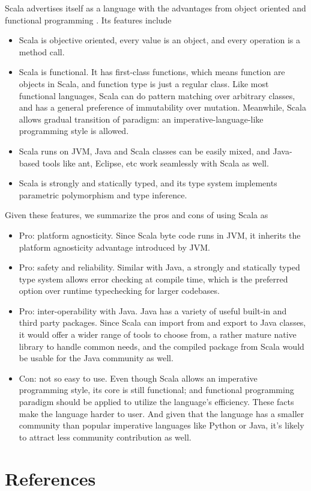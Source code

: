 \documentclass[letterpaper,twocolumn,10pt]{article}
\begin{document}
Scala advertises itself as a language with the advantages from object oriented and functional programming \cite{Scala}. Its features include
\begin{itemize}
\item Scala is objective oriented, every value is an object, and every operation is a method call.
\item Scala is functional. It has first-class functions, which means function are objects in Scala, and function type is just a regular class. Like most functional languages, Scala can do pattern matching over arbitrary classes, and has a general preference of immutability over mutation. Meanwhile, Scala allows gradual transition of paradigm: an imperative-language-like programming style is allowed.
\item Scala runs on JVM, Java and Scala classes can be easily mixed, and Java-based tools like ant, Eclipse, etc work seamlessly with Scala as well.
\item Scala is strongly and statically typed, and its type system implements parametric polymorphism and type inference. \cite{ScalaTypes}
\end{itemize}
Given these features, we summarize the pros and cons of using Scala as
\begin{itemize}
\item Pro: platform agnosticity. Since Scala byte code runs in JVM, it inherits the platform agnosticity advantage introduced by JVM.
\item Pro: safety and reliability. Similar with Java, a strongly and statically typed type system allows error checking at compile time, which is the preferred option over runtime typechecking for larger codebases.
\item Pro: inter-operability with Java. Java has a variety of useful built-in and third party packages. Since Scala can import from and export to Java classes, it would offer a wider range of tools to choose from, a rather mature native library to handle common needs, and the compiled package from Scala would be usable for the Java community as well.
\item Con: not so easy to use. Even though Scala allows an imperative programming style, its core is still functional; and functional programming paradigm should be applied to utilize the language's efficiency. These facts make the language harder to user. And given that the language has a smaller community than popular imperative languages like Python or Java, it's likely to attract less community contribution as well.
\end{itemize}

\section{References}

{\footnotesize 
}
\end{document}
